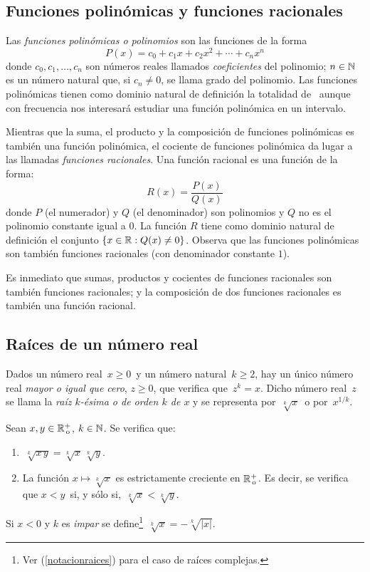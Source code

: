 \documentclass[oneside,spanish,2m,twoside,svgnames,x11names,HTML,12pt]{libro-matua}\usepackage[]{graphicx}\usepackage[]{color}
\begin{document}
\subsection{Funciones polinómicas y funciones racionales}

\noindent Las \emph{funciones polinómicas o polinomios} son las funciones
de la forma 
\[
P(x)=c_{0}+c_{1}x+c_{2}x^{2}+\cdots+c_{n}x^{n}
\]
donde $c_{0},c_{1},\dots,c_{n}$ son números reales llamados \emph{coeficientes}
del polinomio; $n\in\mathbb N$ es un número natural que, si $c_{n}\neq0$,
se llama grado del polinomio. Las funciones polinómicas tienen como
dominio natural de definición la totalidad de \R\ aunque con frecuencia
nos interesará estudiar una función polinómica en un intervalo.

Mientras que la suma, el producto y la composición de funciones polinómicas
es también una función polinómica, el cociente de funciones polinómica
da lugar a las llamadas \emph{funciones racionales}. Una función racional
es una función de la forma: 
\[
R(x)=\frac{P(x)}{Q(x)}
\]
donde $P$ (el numerador) y $Q$ (el denominador) son polinomios y
$Q$ no es el polinomio constante igual a $0$. La función $R$ tiene
como dominio natural de definición el conjunto\linebreak{}
$\{x\in\mathbb R:Q(x)\neq0\}$. Observa que las funciones polinómicas son
también funciones racionales (con denominador constante $1$).

Es inmediato que sumas, productos y cocientes de funciones racionales
son también funciones racionales; y la composición de dos funciones
racionales es también una función racional.

\subsection{Raíces de un número real}

Dados un número real $\,x\ge0\,$ y un número natural $\,k\geqslant2$,
hay un único número real \emph{mayor o igual que cero}, $z\ge0$,
que verifica que $\,z^{k}=x$. Dicho número real $\,z\,$ se llama
la \emph{raíz $k$-ésima o de orden $k$ de $x$} y se representa
por $\,\sqrt[k]{x}\,$ o por $\,x^{1/k}$. \begin{proposicion}{}{}
Sean $x,y\in{\mathbb R}^{+}_{\,\rm o}$, $k\in\mathbb N$. Se verifica que: 
\begin{enumerate}
\item $\ \sqrt[k]{x\,y}=\sqrt[k]{x}\,\sqrt[k]{y}$. 
\item La función $x\mapsto\sqrt[k]{x}$ es estrictamente creciente en ${\mathbb R}^{+}_{\,\rm o}$.
Es decir, se verifica que $x<y\,$ si, y sólo si, $\,\sqrt[k]{x}<\sqrt[k]{y}$. 
\end{enumerate}
\end{proposicion} Si $x<0$ y $k$ es \emph{impar} se define\footnote{Ver (\ref{notacionraices}) para el caso de raíces complejas.}
$\,\sqrt[k]{x}=-\sqrt[k]{|x|}$.
\end{document}
